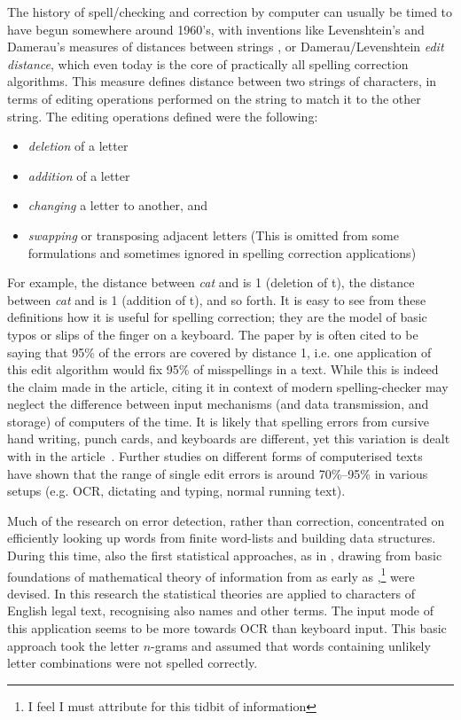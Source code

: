 \documentclass[officiallayout]{unihelcompling}
\newcommand\misspelt{\bgroup\markoverwith
{\textcolor{red}{\lower3.5pt\hbox{\sixly \char58}}}\ULon}
\begin{document}
The history of spell\-/checking and correction by computer can usually be timed
to have begun somewhere around 1960's, with inventions like Levenshtein's and
Damerau's measures of distances between strings
\citep{levenshtein1966binary,damerau1964technique}, or Damerau\-/Levenshtein
\emph{edit distance}, which even today is the core of practically all spelling
correction algorithms. This measure defines distance between two strings of
characters, in terms of editing operations performed on the string to match it
to the other string. The editing operations defined were the following:

\begin{itemize}
    \item \emph{deletion} of a letter
    \item \emph{addition} of a letter
    \item \emph{changing} a letter to another, and
    \item \emph{swapping} or transposing adjacent letters
        (This is omitted from some formulations and sometimes ignored in
        spelling correction applications)
\end{itemize}

For example, the distance between \emph{cat} and \misspelt{ca} is 1 (deletion
of t), the distance between \emph{cat} and \misspelt{catt} is 1 (addition of
t), and so forth.  It is easy to see from these definitions how it is useful
for spelling correction; they are the model of basic typos or slips of the
finger on a keyboard. The paper by \citet{damerau1964technique} is often cited
to be saying that 95\% of the errors are covered by distance 1, i.e. one
application of this edit algorithm would fix 95\% of misspellings in a text.
While this is indeed the claim made in the article, citing it in context of
modern spelling-checker may neglect the difference between input mechanisms
(and data transmission, and storage) of computers of the time. It is likely
that spelling errors from cursive hand writing, punch cards, and keyboards are
different, yet this variation is dealt with in the
article~\citep{damerau1964technique}. Further studies on different forms of
computerised texts~\citep{kukich1992techniques} have shown that the range of
single edit errors is around 70\%--95\% in various setups (e.g. OCR,
dictating and typing, normal running text).

Much of the research on error detection, rather than correction, concentrated
on efficiently looking up words from finite word-lists and building data
structures. During this time, also the first statistical approaches, as in
\citet{raviv1967decision}, drawing from basic foundations of mathematical
theory of information from as early as
\citet{shannon1948mathematical},\footnote{I feel I must attribute
\citet{liberman2012noisily} for this tidbit of information} were devised. In
this research the statistical theories are applied to characters of English
legal text, recognising also names and other terms. The input mode of this
application seems to be more towards OCR than keyboard input. This basic
approach took the letter \(n\)-grams and assumed that words containing unlikely
letter combinations were not spelled correctly.
\end{document}
